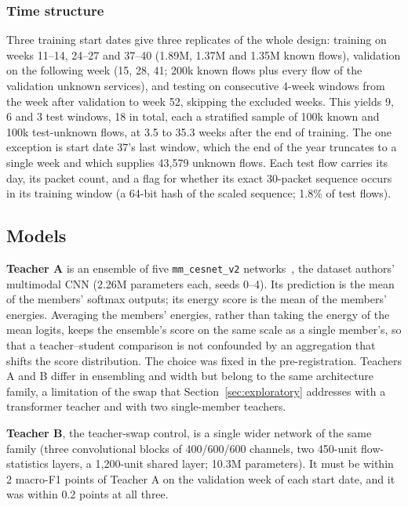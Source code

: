\documentclass[journal]{IEEEtran}
\begin{document}
\subsubsection*{Time structure}
Three training start dates give three replicates of the whole design: training on weeks 11--14, 24--27 and 37--40 (1.89M, 1.37M and 1.35M known flows), validation on the following week (15, 28, 41; 200k known flows plus every flow of the validation unknown services), and testing on consecutive 4-week windows from the week after validation to week 52, skipping the excluded weeks. This yields 9, 6 and 3 test windows, 18 in total, each a stratified sample of 100k known and 100k test-unknown flows, at 3.5 to 35.3 weeks after the end of training. The one exception is start date 37's last window, which the end of the year truncates to a single week and which supplies 43,579 unknown flows. Each test flow carries its day, its packet count, and a flag for whether its exact 30-packet sequence occurs in its training window (a 64-bit hash of the scaled sequence; 1.8\% of test flows).

\subsection{Models}

\textbf{Teacher A} is an ensemble of five \texttt{mm\_cesnet\_v2} networks~\cite{luxemburk2024year22}, the dataset authors' multimodal CNN (2.26M parameters each, seeds 0--4). Its prediction is the mean of the members' softmax outputs; its energy score is the mean of the members' energies. Averaging the members' energies, rather than taking the energy of the mean logits, keeps the ensemble's score on the same scale as a single member's, so that a teacher--student comparison is not confounded by an aggregation that shifts the score distribution. The choice was fixed in the pre-registration. Teachers A and B differ in ensembling and width but belong to the same architecture family, a limitation of the swap that Section~\ref{sec:exploratory} addresses with a transformer teacher and with two single-member teachers.

\textbf{Teacher B}, the teacher-swap control, is a single wider network of the same family (three convolutional blocks of 400/600/600 channels, two 450-unit flow-statistics layers, a 1,200-unit shared layer; 10.3M parameters). It must be within 2 macro-F1 points of Teacher A on the validation week of each start date, and it was within 0.2 points at all three.
\end{document}

